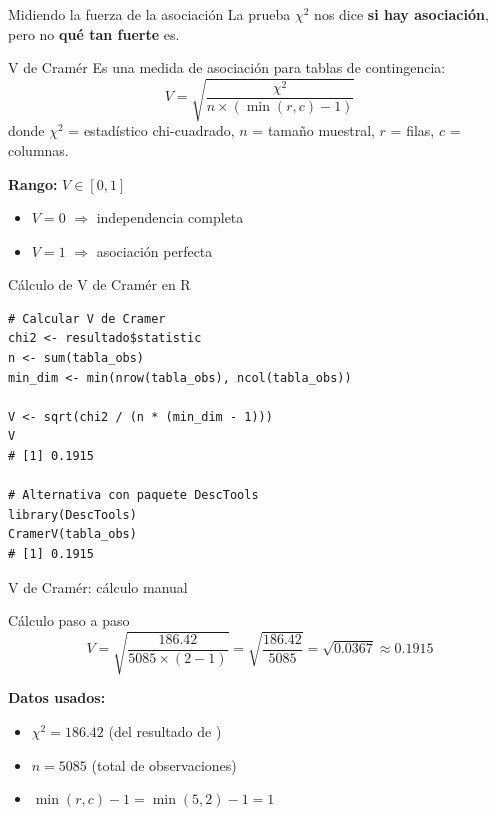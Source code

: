 \documentclass[aspectratio=169, 11pt]{beamer}
\begin{document}
\begin{frame}{Midiendo la fuerza de la asociación}
La prueba $\chi^2$ nos dice \textbf{si hay asociación}, pero no \textbf{qué tan fuerte} es.

\vspace{0.2cm}
\begin{block}{V de Cramér}
Es una medida de asociación para tablas de contingencia:
\[
V = \sqrt{\frac{\chi^2}{n \times (\min(r,c) - 1)}}
\]
donde $\chi^2$ = estadístico chi-cuadrado, $n$ = tamaño muestral, $r$ = filas, $c$ = columnas.
\end{block}

\vspace{0.2cm}
\textbf{Rango:} $V \in [0, 1]$
\begin{itemize}
  \item $V = 0$ $\Rightarrow$ independencia completa
  \item $V = 1$ $\Rightarrow$ asociación perfecta
\end{itemize}
\end{frame}

\begin{frame}[fragile]{Cálculo de V de Cramér en R}
\begin{lstlisting}
# Calcular V de Cramer
chi2 <- resultado$statistic
n <- sum(tabla_obs)
min_dim <- min(nrow(tabla_obs), ncol(tabla_obs))

V <- sqrt(chi2 / (n * (min_dim - 1)))
V
# [1] 0.1915

# Alternativa con paquete DescTools
library(DescTools)
CramerV(tabla_obs)
# [1] 0.1915
\end{lstlisting}
\end{frame}

\begin{frame}{V de Cramér: cálculo manual}
\begin{exampleblock}{Cálculo paso a paso}
\[
V = \sqrt{\frac{186.42}{5085 \times (2-1)}} = \sqrt{\frac{186.42}{5085}} = \sqrt{0.0367} \approx 0.1915
\]
\end{exampleblock}

\vspace{0.3cm}
\textbf{Datos usados:}
\begin{itemize}
  \item $\chi^2 = 186.42$ (del resultado de )
  \item $n = 5085$ (total de observaciones)
  \item $\min(r, c) - 1 = \min(5, 2) - 1 = 1$
\end{itemize}
\end{frame}
\end{document}
